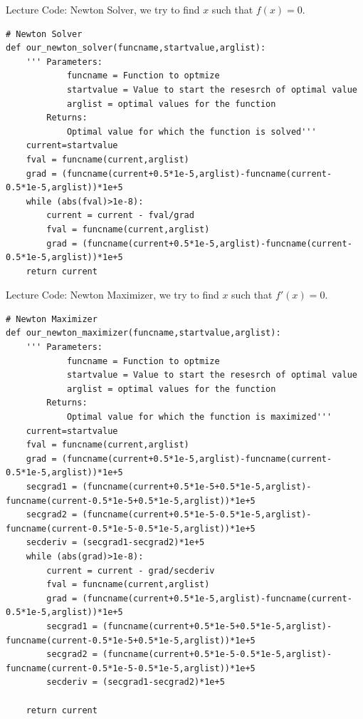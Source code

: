 \documentclass[a4paper, 12pt, reqno]{article}
\begin{document}
Lecture Code: Newton Solver, we try to find $x$ such that $f(x)=0$.
\begin{lstlisting}[frame=single]
# Newton Solver 
def our_newton_solver(funcname,startvalue,arglist):
    ''' Parameters:
            funcname = Function to optmize
            startvalue = Value to start the resesrch of optimal value
            arglist = optimal values for the function
        Returns:
            Optimal value for which the function is solved'''
    current=startvalue
    fval = funcname(current,arglist)
    grad = (funcname(current+0.5*1e-5,arglist)-funcname(current-0.5*1e-5,arglist))*1e+5
    while (abs(fval)>1e-8):
        current = current - fval/grad
        fval = funcname(current,arglist)
        grad = (funcname(current+0.5*1e-5,arglist)-funcname(current-0.5*1e-5,arglist))*1e+5        
    return current 
\end{lstlisting}    

Lecture Code: Newton Maximizer, we try to find $x$ such that $f'(x)=0$.
\begin{lstlisting}[frame=single]
    # Newton Maximizer
def our_newton_maximizer(funcname,startvalue,arglist):
    ''' Parameters:
            funcname = Function to optmize
            startvalue = Value to start the resesrch of optimal value
            arglist = optimal values for the function
        Returns:
            Optimal value for which the function is maximized'''
    current=startvalue
    fval = funcname(current,arglist)
    grad = (funcname(current+0.5*1e-5,arglist)-funcname(current-0.5*1e-5,arglist))*1e+5
    secgrad1 = (funcname(current+0.5*1e-5+0.5*1e-5,arglist)-funcname(current-0.5*1e-5+0.5*1e-5,arglist))*1e+5
    secgrad2 = (funcname(current+0.5*1e-5-0.5*1e-5,arglist)-funcname(current-0.5*1e-5-0.5*1e-5,arglist))*1e+5
    secderiv = (secgrad1-secgrad2)*1e+5
    while (abs(grad)>1e-8):
        current = current - grad/secderiv
        fval = funcname(current,arglist)
        grad = (funcname(current+0.5*1e-5,arglist)-funcname(current-0.5*1e-5,arglist))*1e+5
        secgrad1 = (funcname(current+0.5*1e-5+0.5*1e-5,arglist)-funcname(current-0.5*1e-5+0.5*1e-5,arglist))*1e+5
        secgrad2 = (funcname(current+0.5*1e-5-0.5*1e-5,arglist)-funcname(current-0.5*1e-5-0.5*1e-5,arglist))*1e+5
        secderiv = (secgrad1-secgrad2)*1e+5

    return current 
    \end{lstlisting}  
\end{document}
